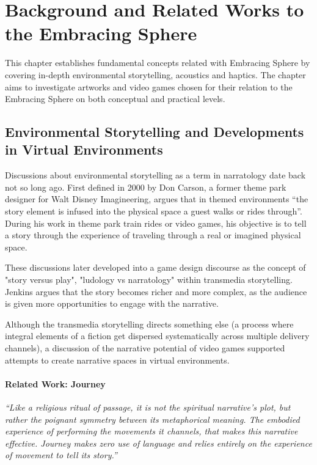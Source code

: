 \chapter{Background and Related Works to the Embracing Sphere}
    This chapter establishes fundamental concepts related with Embracing Sphere by covering in-depth environmental storytelling, acoustics and haptics. The chapter aims to investigate artworks and video games chosen for their relation to the Embracing Sphere on both conceptual and practical levels.\par
    \section{Environmental Storytelling and Developments in Virtual Environments}
        Discussions about environmental storytelling as a term in narratology date back not so long ago. First defined in 2000 by Don Carson, a former theme park designer for Walt Disney Imagineering, argues that in themed environments “the story element is infused into the physical space a guest walks or rides through”\cite{Liminal_Space_Between_Embedded_and_Emergent_Narrative}. During his work in theme park train rides or video games, his objective is to tell a story through the experience of traveling through a real or imagined physical space\cite{Lessons_Learned_from_the_Theme_Park_Industry}.\par

        These discussions later developed into a game design discourse as the concept of "story versus play", "ludology vs narratology\cite{Hamlet_on_the_Holodeck}" within transmedia storytelling\cite{Jenkins_Shall_We_Play}. Jenkins argues that the story becomes richer and more complex, as the audience is given more opportunities to engage with the narrative.\par

        Although the transmedia storytelling directs something else (a process where integral elements of a fiction get dispersed systematically across multiple delivery channels\cite{Jenkins_Transmedia}), a discussion of the narrative potential of video games supported attempts to create narrative spaces in virtual environments\cite{Liminal_Space_Between_Embedded_and_Emergent_Narrative}.\par

        \subsubsection{Related Work: Journey}
            \emph{“Like a religious ritual of passage, it is not the spiritual narrative’s plot, but rather the poignant symmetry between its metaphorical meaning. The embodied experience of performing the movements it channels, that makes this narrative effective. Journey makes zero use of language and relies entirely on the experience of movement to tell its story\cite{Game_Movement_as_Enactive_Focalization}\cite{Narrative_Geography}.”}\par

